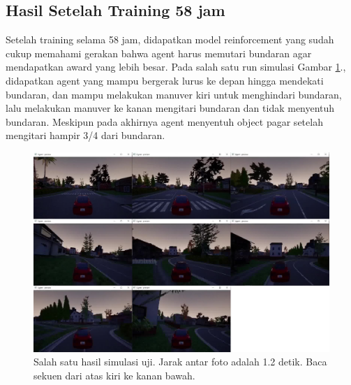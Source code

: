 \subsection{Hasil Setelah Training 58 jam}
\label{sec:hasil_training_12}
Setelah training selama 58 jam, didapatkan model reinforcement yang sudah cukup memahami gerakan bahwa agent harus memutari bundaran agar mendapatkan award yang lebih besar. Pada salah satu run simulasi Gambar \ref{fig:uji1}., didapatkan agent yang mampu bergerak lurus ke depan hingga mendekati bundaran, dan mampu melakukan manuver kiri untuk menghindari bundaran, lalu melakukan manuver ke kanan mengitari bundaran dan tidak menyentuh bundaran. Meskipun pada akhirnya agent menyentuh object pagar setelah mengitari hampir 3/4 dari bundaran.
\begin{figure}[H] 
	\centering
	\includegraphics[width=1\linewidth]{images/uji1}
	\caption{Salah satu hasil simulasi uji. Jarak antar foto adalah 1.2 detik. Baca sekuen dari atas kiri ke kanan bawah.}
	\label{fig:uji1}
\end{figure}
\fi
